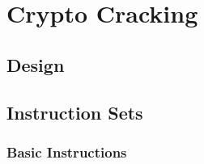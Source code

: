 \providecommand{\heading}[1]{\section{#1}}







\providecommand{\subheading}[1]{\subsection{#1}}















\heading{Crypto Cracking}\label{subsec:CTFs-cc}















    \subheading{Design}















    \subheading{Instruction Sets}\label{subsubsec:CTFs-cc-instructions}















        \subsubsection{Basic Instructions}







            \noindent








